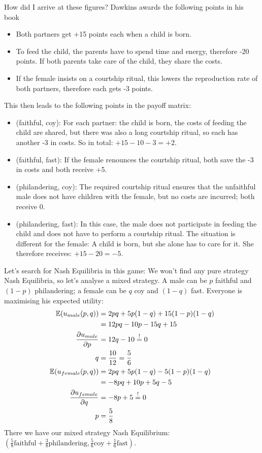 \documentclass{article}
\newcommand{\E}{\mathbb{E}}
\begin{document}
	How did I arrive at these figures? Dawkins awards the following points in his book
	\begin{itemize}
		\item Both partners get +15 points each when a child is born.
		\item To feed the child, the parents have to spend time and energy, therefore -20 points. If both parents take care of the child, they share the costs.
		\item If the female insists on a courtship ritual, this lowers the reproduction rate of both partners, therefore each gets -3 points.
	\end{itemize}
	This then leads to the following points in the payoff matrix:
	\begin{itemize}
		\item (faithful, coy): For each partner: the child is born, the costs of feeding the child are shared, but there was also a long courtship ritual, so each has another -3 in costs. So in total: $+15 - 10 - 3 = +2$.
		\item (faithful, fast): If the female renounces the courtship ritual, both save the -3 in costs and both receive +5.
		\item (philandering, coy): The required courtship ritual ensures that the unfaithful male does not have children with the female, but no costs are incurred; both receive 0.
		\item (philandering, fast): In this case, the male does not participate in feeding the child and does not have to perform a courtship ritual. The situation is different for the female: A child is born, but she alone has to care for it. She therefore receives: $+15 - 20 = -5$.
	\end{itemize}
	Let's search for Nash Equilibria in this game: We won't find any pure strategy Nash Equilibria, so let's analyse a mixed strategy. A male can be $p$ faithful and $(1-p)$ philandering; a female can be $q$ coy and $(1-q)$ fast. Everyone is maximising his expected utility:
	\begin{align}
		\E(u_{male}(p,q)) &= 2pq + 5p(1-q) + 15(1-p)(1-q) \notag \\
		&= 12pq - 10p - 15q + 15 \notag \\
		\frac{\partial u_{male}}{\partial p} &= 12q - 10 \overset{!}{=} 0 \notag \\
		q &= \frac{10}{12} = \frac{5}{6} \notag \\
		\E(u_{female}(p,q)) &= 2pq + 5p(1-q) - 5(1-p)(1-q) \notag \\
		&= -8pq + 10p + 5q - 5 \notag \\
		\frac{\partial u_{female}}{\partial q} &= -8p + 5 \overset{!}{=} 0 \notag \\
		p &= \frac{5}{8} \notag
	\end{align}
	There we have our mixed strategy Nash Equilibrium: $\left(\frac{5}{8}\text{faithful} + \frac{3}{8}\text{philandering}, \frac{5}{6}\text{coy} + \frac{1}{6}\text{fast}\right)$.
	
\end{document}
